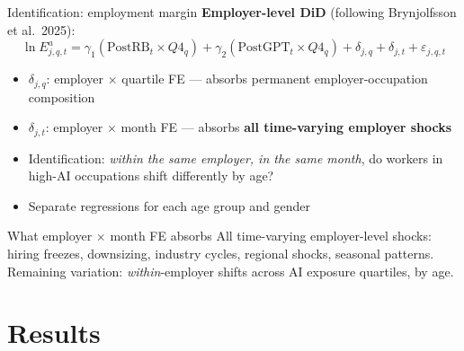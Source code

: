 \documentclass[aspectratio=169,11pt]{beamer}
\begin{document}
\begin{frame}{Identification: employment margin}
\textbf{Employer-level DiD} (following Brynjolfsson et al.\ 2025):
\vspace{-2mm}
\begin{equation*}
\ln E_{j,q,t}^{a} = \gamma_1 (\text{PostRB}_t \times Q4_q) + \gamma_2 (\text{PostGPT}_t \times Q4_q ) + \delta_{j,q} + \delta_{j,t} + \varepsilon_{j,q,t}
\end{equation*}

\begin{itemize}
    \item $\delta_{j,q}$: employer $\times$ quartile FE --- absorbs permanent employer-occupation composition
    \item $\delta_{j,t}$: employer $\times$ month FE --- absorbs \textbf{all time-varying employer shocks}
    \item[$\Rightarrow$] Identification: \textit{within the same employer, in the same month}, do workers in high-AI occupations shift differently by age?
    \item Separate regressions for each age group and gender
\end{itemize}
\vspace{2mm}
\begin{alertblock}{What employer $\times$ month FE absorbs}
All time-varying employer-level shocks: hiring freezes, downsizing, industry cycles, regional shocks, seasonal patterns. Remaining variation: \textit{within}-employer shifts across AI exposure quartiles, by age.
\end{alertblock}
\end{frame}

\section{Results}
\end{document}
